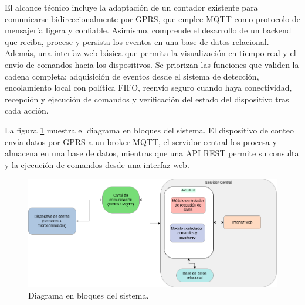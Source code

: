 El alcance técnico incluye la adaptación de un contador existente para comunicarse bidireccionalmente por GPRS, que emplee MQTT como protocolo de mensajería ligera y confiable. Asimismo, comprende el desarrollo de un backend que reciba, procese y persista los eventos en una base de datos relacional. Además, una interfaz web básica que permita la visualización en tiempo real y el envío de comandos hacia los dispositivos. Se priorizan las funciones que validen la cadena completa: adquisición de eventos desde el sistema de detección, encolamiento local con política FIFO, reenvío seguro cuando haya conectividad, recepción y ejecución de comandos y verificación del estado del dispositivo tras cada acción. 



La figura \ref{fig:diag_bloques} muestra el diagrama en bloques del sistema. 
El dispositivo de conteo envía datos por GPRS a un broker MQTT, el servidor central 
los procesa y almacena en una base de datos, mientras que una API REST permite su 
consulta y la ejecución de comandos desde una interfaz web.

\vspace{1cm}

\begin{figure}[htbp]
  \centering
  \includegraphics[width=\linewidth]{./Figures/diagBloques.png}
  \caption{Diagrama en bloques del sistema.}
  \label{fig:diag_bloques}
\end{figure}

\vspace{1cm}










